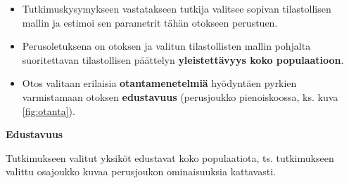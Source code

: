 \documentclass[
]{book}
\providecommand{\tightlist}{%
  \setlength{\itemsep}{0pt}\setlength{\parskip}{0pt}}
\begin{document}
\begin{itemize}
  \begin{itemize}
  \tightlist
  \item
    Tutkimuskysymykseen vastatakseen tutkija valitsee sopivan tilastollisen mallin ja estimoi sen parametrit tähän otokseen perustuen.
  \item
    Perusoletuksena on otoksen ja valitun tilastollisten mallin pohjalta suoritettavan tilastollisen päättelyn \textbf{yleistettävyys koko populaatioon}.
  \item
    Otos valitaan erilaisia \textbf{otantamenetelmiä} hyödyntäen pyrkien varmistamaan otoksen \textbf{edustavuus} (perusjoukko pienoiskoossa, ks. kuva \ref{fig:otanta}).
  \end{itemize}
\end{itemize}

\begin{defblock}{}
\textbf{Edustavuus}

Tutkimukseen valitut yksiköt edustavat koko populaatiota, ts. tutkimukseen valittu osajoukko kuvaa perusjoukon ominaisuuksia kattavasti.

\end{defblock}
\end{document}

